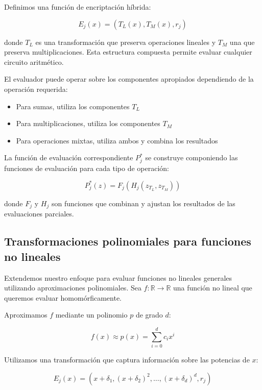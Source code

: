 \documentclass[11pt]{article}
\theoremstyle{plain}
\begin{document}
Definimos una funci\'on de encriptaci\'on h\'ibrida:

\begin{equation}
E_j(x) = (T_L(x), T_M(x), r_j)
\end{equation}

donde $T_L$ es una transformaci\'on que preserva operaciones lineales y $T_M$ una que preserva multiplicaciones. Esta estructura compuesta permite evaluar cualquier circuito aritm\'etico.

El evaluador puede operar sobre los componentes apropiados dependiendo de la operaci\'on requerida:
\begin{itemize}
    \item Para sumas, utiliza los componentes $T_L$
    \item Para multiplicaciones, utiliza los componentes $T_M$
    \item Para operaciones mixtas, utiliza ambos y combina los resultados
\end{itemize}

La funci\'on de evaluaci\'on correspondiente $P^*_j$ se construye componiendo las funciones de evaluaci\'on para cada tipo de operaci\'on:

\begin{equation}
P^*_j(z) = F_j(H_j(z_{T_L}, z_{T_M}))
\end{equation}

donde $F_j$ y $H_j$ son funciones que combinan y ajustan los resultados de las evaluaciones parciales.

\subsection{Transformaciones polinomiales para funciones no lineales}

Extendemos nuestro enfoque para evaluar funciones no lineales generales utilizando aproximaciones polinomiales. Sea $f: \mathbb{R} \rightarrow \mathbb{R}$ una funci\'on no lineal que queremos evaluar homom\'orficamente.

Aproximamos $f$ mediante un polinomio $p$ de grado $d$:

\begin{equation}
f(x) \approx p(x) = \sum_{i=0}^d c_i x^i
\end{equation}

Utilizamos una transformaci\'on que captura informaci\'on sobre las potencias de $x$:

\begin{equation}
E_j(x) = (x + \delta_1, (x + \delta_2)^2, \ldots, (x + \delta_d)^d, r_j)
\end{equation}
\end{document}

